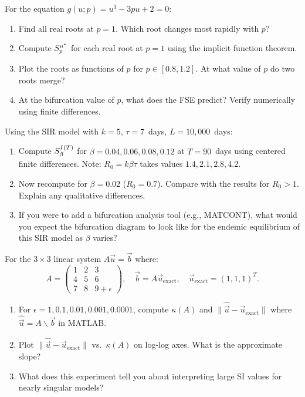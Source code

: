 \begin{exercise}[\bloom{L3}]
\label{ex:ch8:quadratic}
For the equation $g(u; p) = u^3 - 3pu + 2 = 0$:
\begin{enumerate}[label=(\alph*)]
  \item Find all real roots at $p = 1$. Which root changes most rapidly with $p$?
  \item Compute $S_{p}^{u^*}$ for each real root at $p = 1$
        using the implicit function theorem.
  \item Plot the roots as functions of $p$ for $p \in [0.8, 1.2]$.
        At what value of $p$ do two roots merge?
  \item At the bifurcation value of $p$, what does the FSE predict?
        Verify numerically using finite differences.
\end{enumerate}
\end{exercise}

\begin{exercise}[\bloom{L3}]
\label{ex:ch8:SIRthreshold}
Using the SIR model with $k = 5$, $\tau = 7$~days, $L = 10{,}000$~days:
\begin{enumerate}[label=(\alph*)]
  \item Compute $S_{\beta}^{I(T)}$ for $\beta = 0.04, 0.06, 0.08, 0.12$
        at $T = 90$~days using centered finite differences.
        Note: $R_0 = k\beta\tau$ takes values $1.4, 2.1, 2.8, 4.2$.
  \item Now recompute for $\beta = 0.02$ ($R_0 = 0.7$).
        Compare with the results for $R_0 > 1$. Explain any qualitative differences.
  \item If you were to add a bifurcation analysis tool (e.g., MATCONT),
        what would you expect the bifurcation diagram to look like for
        the endemic equilibrium of this SIR model as $\beta$ varies?
\end{enumerate}
\end{exercise}

\begin{exercise}[\bloom{L4}]
\label{ex:ch8:conditioning}
For the $3\times3$ linear system $A\vec{u} = \vec{b}$ where:
\[
  A = \begin{pmatrix} 1 & 2 & 3 \\ 4 & 5 & 6 \\ 7 & 8 & 9+\epsilon \end{pmatrix},
  \quad \vec{b} = A\vec{u}_{\text{exact}}, \quad \vec{u}_{\text{exact}} = (1,1,1)^T.
\]
\begin{enumerate}[label=(\alph*)]
  \item For $\epsilon = 1, 0.1, 0.01, 0.001, 0.0001$, compute $\kappa(A)$
        and $\|\hat{\vec{u}} - \vec{u}_{\text{exact}}\|$ where
        $\hat{\vec{u}} = A\backslash\vec{b}$ in MATLAB.
  \item Plot $\|\hat{\vec{u}} - \vec{u}_{\text{exact}}\|$ vs.\ $\kappa(A)$
        on log-log axes. What is the approximate slope?
  \item What does this experiment tell you about interpreting large SI values
        for nearly singular models?
\end{enumerate}
\end{exercise}

